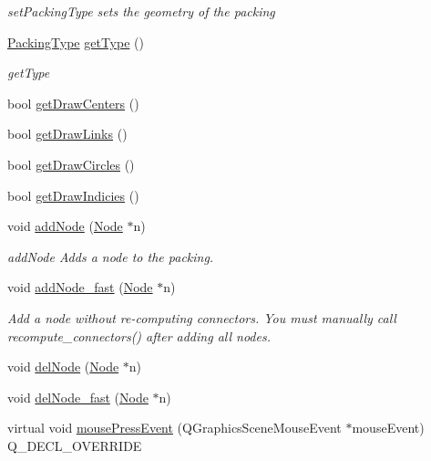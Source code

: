 \begin{DoxyCompactItemize}
\begin{DoxyCompactList}\small\item\em set\+Packing\+Type sets the geometry of the packing \end{DoxyCompactList}\item 
\hyperlink{graphics_2_packing_8hpp_a331874350131c9e1039dac50b427f8b9}{Packing\+Type} \hyperlink{class_packing_a083a0344f87747cd162508a46a2d1e5f}{get\+Type} ()
\begin{DoxyCompactList}\small\item\em get\+Type \end{DoxyCompactList}\item 
bool \hyperlink{class_packing_a7939fca53f87260b846b21dc792804ee}{get\+Draw\+Centers} ()
\item 
bool \hyperlink{class_packing_add444b4756b90ad386a1034a488058c1}{get\+Draw\+Links} ()
\item 
bool \hyperlink{class_packing_a74bf80fb8b944df51b5afbdc3b3ebe24}{get\+Draw\+Circles} ()
\item 
bool \hyperlink{class_packing_a7763554b3b773d4a5b0f1a84eb7522f1}{get\+Draw\+Indicies} ()
\item 
void \hyperlink{class_packing_a9d660a5c187d9fe98b727f0c32e311cd}{add\+Node} (\hyperlink{class_node}{Node} $\ast$n)
\begin{DoxyCompactList}\small\item\em add\+Node Adds a node to the packing. \end{DoxyCompactList}\item 
void \hyperlink{class_packing_a978572ce633b6caca911f83f39057d9c}{add\+Node\+\_\+fast} (\hyperlink{class_node}{Node} $\ast$n)
\begin{DoxyCompactList}\small\item\em Add a node without re-\/computing connectors. You must manually call recompute\+\_\+connectors() after adding all nodes. \end{DoxyCompactList}\item 
void \hyperlink{class_packing_afae173eda1f69d397c81eb74f7d73015}{del\+Node} (\hyperlink{class_node}{Node} $\ast$n)
\item 
void \hyperlink{class_packing_a91ea592eea6af38942733d6b44933317}{del\+Node\+\_\+fast} (\hyperlink{class_node}{Node} $\ast$n)
\item 
virtual void \hyperlink{class_packing_a6e130881196259c6594dd4bb2e96da4f}{mouse\+Press\+Event} (Q\+Graphics\+Scene\+Mouse\+Event $\ast$mouse\+Event) Q\+\_\+\+D\+E\+C\+L\+\_\+\+O\+V\+E\+R\+R\+I\+D\+E
\item 

\end{DoxyCompactItemize}
